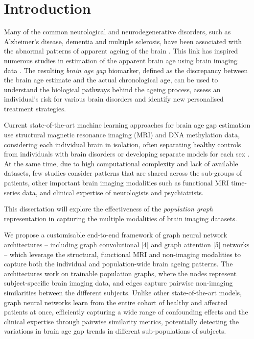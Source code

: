 \chapter{Introduction}



Many of the common neurological and neurodegenerative disorders, such as Alzheimer’s disease, dementia and multiple sclerosis, have been associated with the abnormal patterns of apparent ageing of the brain \cite{kaufmann2019}. This link has inspired numerous studies in estimation of the apparent brain age using brain imaging data \cite{franke2019ten}. The resulting \textit{brain age gap} biomarker, defined as the discrepancy between the brain age estimate and the actual chronological age, can be used to understand the biological pathways behind the ageing process, assess an individual’s risk for various brain disorders and identify new personalised treatment strategies.

Current state-of-the-art machine learning approaches for brain age gap estimation use structural magnetic resonance imaging (MRI) and DNA methylation data, considering each individual brain in isolation, often separating healthy controls from individuals with brain disorders or developing separate models for each sex \cite{kaufmann2019,niu2019improved}. At the same time, due to high computational complexity and lack of available datasets, few studies consider patterns that are shared across the sub-groups of patients, other important brain imaging modalities such as functional MRI time-series data, and clinical expertise of neurologists and psychiatrists.

This dissertation will explore the effectiveness of the \textit{population graph} representation in capturing the multiple modalities of brain imaging datasets. 

We propose a customisable end-to-end framework of graph neural network architectures – including graph convolutional [4] and graph attention [5] networks – which leverage the structural, functional MRI and non-imaging modalities to capture both the individual and population-wide brain ageing patterns. The architectures work on trainable population graphs, where the nodes represent subject-specific brain imaging data, and edges capture pairwise non-imaging similarities between the different subjects. Unlike other state-of-the-art models, graph neural networks learn from the entire cohort of healthy and affected patients at once, efficiently capturing a wide range of confounding effects and the clinical expertise through pairwise similarity metrics, potentially detecting the variations in brain age gap trends in different sub-populations of subjects.

